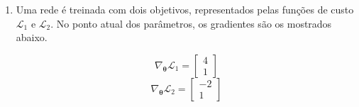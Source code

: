 \documentclass{dlproblemset}
\begin{document}
\begin{enumerate}[1)]
    \begin{enumerate}[(a)]
        \item 1-(iv); 2-(ii); 3-(iii); 4-(i)
        \item 1-(iii); 2-(i); 3-(ii); 4-(iv)
        \item 1-(ii); 2-(iv); 3-(i); 4-(iii)
        \item 1-(i); 2-(iii); 3-(ii); 4-(iv)
        \item 1-(iv); 2-(ii); 3-(i); 4-(iii)
        \item 1-(iii); 2-(i); 3-(iv); 4-(ii)
        \item 1-(i); 2-(iii); 3-(iv); 4-(ii)
        \item 1-(ii); 2-(iv); 3-(iii); 4-(i)
    \end{enumerate}

    \item Uma rede é treinada com dois objetivos, representados pelas funções de custo $\mathcal{L}_1$ e $\mathcal{L}_2$. No ponto atual dos parâmetros, os gradientes são os mostrados abaixo.

    \begin{center}
    \begin{minipage}{0.3\linewidth}
    \[
    \nabla_{\boldsymbol{\theta}}\mathcal{L}_1 = \begin{bmatrix} 4 \\ 1 \end{bmatrix}
    \]
    \[
    \nabla_{\boldsymbol{\theta}}\mathcal{L}_2 = \begin{bmatrix} -2 \\ 1 \end{bmatrix}
    \]
    \end{minipage}%
    \begin{minipage}{0.68\linewidth}\centering
    \end{minipage}
    \end{center}


\end{enumerate}
\end{document}
